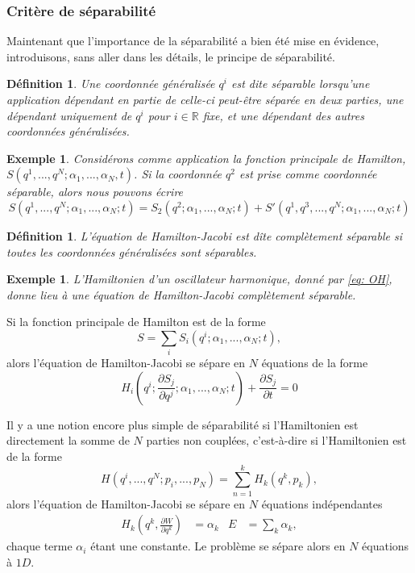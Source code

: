 \documentclass[11pt,oneside,a4paper]{article}
\newcommand{\dif}[2]{\frac{\partial #1}{\partial #2}}
\newtheorem{definition}[theorem]{Définition}
\newtheorem{example}[theorem]{Exemple}
\begin{document}
    \subsubsection{Critère de séparabilité}

    Maintenant que l'importance de la séparabilité a bien été mise en évidence, introduisons, sans aller dans les détails, le principe de séparabilité.

    \begin{definition}
      Une coordonnée généralisée $q^i$ est dite \emph{séparable} lorsqu'une application dépendant en partie de celle-ci peut-être \emph{séparée} en deux parties, une dépendant uniquement de $q^i$ pour $i\in\mathbb{R}$ fixe, et une dépendant des autres coordonnées généralisées.
    \end{definition}

    \begin{example}
      Considérons comme application la fonction principale de Hamilton, $S(q^1,...,q^N;\alpha_1,...,\alpha_N,t)$. Si la coordonnée $q^2$ est prise comme coordonnée séparable, alors nous pouvons écrire 
      \begin{equation}
        S(q^1,...,q^N;\alpha_1,...,\alpha_N;t) = S_2(q^2;\alpha_1,...,\alpha_N;t) + S'(q^1,q^3,...,q^N;\alpha_1,...,\alpha_N;t)
      \end{equation}  
    \end{example}

    \begin{definition}\label{def: completement separable}
      L'équation de Hamilton-Jacobi est dîte complètement séparable si toutes les coordonnées généralisées sont séparables.
    \end{definition}
    \begin{example}
      L'Hamiltonien d'un oscillateur harmonique, donné par \eqref{eq: OH}, donne lieu à une équation de Hamilton-Jacobi complètement séparable.
    \end{example}
    Si la fonction principale de Hamilton est de la forme
    \begin{equation}
      S = \sum_i S_i(q^i;\alpha_1,...,\alpha_N;t),
    \end{equation}
    alors l'équation de Hamilton-Jacobi se sépare en $N$ équations de la forme
    \begin{equation}
      H_i(q^i;\dif{S_j}{q^j};\alpha_1,...,\alpha_N;t) + \dif{S_j}{t} = 0
    \end{equation}
    
    Il y a une notion encore plus simple de séparabilité si l'Hamiltonien est directement la somme de $N$ parties non couplées, c'est-à-dire si l'Hamiltonien est de la forme
    \begin{equation}
      H(q^i,...,q^N;p_i,...,p_N) = \sum_{n = 1}^k H_k(q^k,p_k),
    \end{equation}
    alors l'équation de Hamilton-Jacobi se sépare en $N$ équations indépendantes
    \begin{align}
      H_k(q^k,\dif{W}{q^k}) &= \alpha_k & E &= \sum_k \alpha_k,
    \end{align}
    chaque terme $\alpha_i$ étant une constante. Le problème se sépare alors en $N$ équations à $1D$.\\
\end{document}

